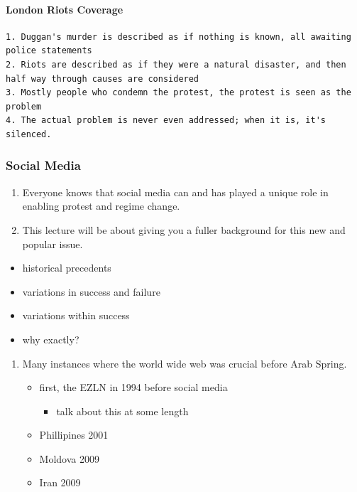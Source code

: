 \documentclass[12pt,book]{article}
\begin{document}
\paragraph{London Riots Coverage}\label{london-riots-coverage}

\begin{verbatim}
1. Duggan's murder is described as if nothing is known, all awaiting police statements
2. Riots are described as if they were a natural disaster, and then half way through causes are considered
3. Mostly people who condemn the protest, the protest is seen as the problem
4. The actual problem is never even addressed; when it is, it's silenced.
\end{verbatim}

\subsubsection{Social Media}\label{social-media}

\begin{enumerate}
\def\labelenumi{\arabic{enumi}.}
\item
  Everyone knows that social media can and has played a unique role in
  enabling protest and regime change.
\item
  This lecture will be about giving you a fuller background for this new
  and popular issue.
\end{enumerate}

\begin{itemize}
\itemsep1pt\parskip0pt
\item
  historical precedents
\item
  variations in success and failure
\item
  variations within success
\item
  why exactly?
\end{itemize}

\begin{enumerate}
\def\labelenumi{\arabic{enumi}.}
\itemsep1pt\parskip0pt
\item
  Many instances where the world wide web was crucial before Arab
  Spring.

  \begin{itemize}
  \itemsep1pt\parskip0pt
  \item
    first, the EZLN in 1994 before social media

    \begin{itemize}
    \itemsep1pt\parskip0pt
    \item
      talk about this at some length
    \end{itemize}
  \item
    Phillipines 2001
  \item
    Moldova 2009
  \item
    Iran 2009
  \end{itemize}
\end{enumerate}
\end{document}
